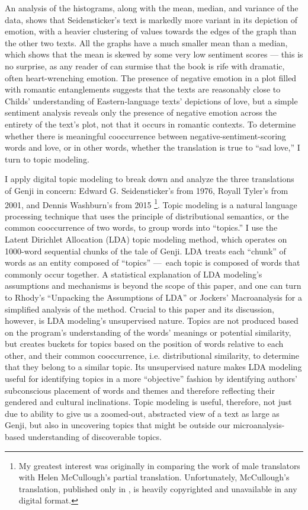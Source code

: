 \documentclass[12pt]{article}
\begin{document}
\begin{flushleft}
\begin{spacing}{2.0}
An analysis of the histograms, along with the mean, median, and variance of the data, shows that Seidensticker's text is markedly more variant in its depiction of emotion, with a heavier clustering of values towards the edges of the graph than the other two texts. All the graphs have a much smaller mean than a median, which shows that the mean is skewed by some very low sentiment scores --- this is no surprise, as any reader of  can surmise that the book is rife with dramatic, often heart-wrenching emotion. The presence of negative emotion in a plot filled with romantic entanglements suggests that the texts are reasonably close to Childs' understanding of Eastern-language texts' depictions of love, but a simple sentiment analysis reveals only the presence of negative emotion across the entirety of the text's plot, not that it occurs in romantic contexts. To determine whether there is meaningful cooccurrence between negative-sentiment-scoring words and love, or in other words, whether the translation is true to ``sad love,'' I turn to topic modeling. 

I apply digital topic modeling to break down and analyze the three translations of Genji in concern: Edward G. Seidensticker's from 1976, Royall Tyler's from 2001, and Dennis Washburn's from 2015 \footnote{ My greatest interest was originally in comparing the work of male translators with Helen McCullough's partial translation. Unfortunately, McCullough's translation, published only in , is heavily copyrighted and unavailable in any digital format.}. Topic modeling is a natural language processing technique that uses the principle of distributional semantics, or the common cooccurrence of two words, to group words into ``topics.'' I use the Latent Dirichlet Allocation (LDA) topic modeling method, which operates on 1000-word sequential chunks of the tale of Genji. LDA treats each ``chunk'' of words as an entity composed of ``topics'' --- each topic is composed of words that commonly occur together. A statistical explanation of LDA modeling's assumptions and mechanisms is beyond the scope of this paper, and one can turn to Rhody's ``Unpacking the Assumptions of LDA'' or Jockers' Macroanalysis for a simplified analysis of the method. Crucial to this paper and its discussion, however, is LDA modeling's unsupervised nature. Topics are not produced based on the program's understanding of the words' meanings or potential similarity, but creates buckets for topics based on the position of words relative to each other, and their common cooccurrence, i.e. distributional similarity, to determine that they belong to a similar topic. Its unsupervised nature makes LDA modeling useful for identifying topics in a more ``objective'' fashion by identifying authors' subconscious placement of words and themes and therefore reflecting their gendered and cultural inclinations. Topic modeling is useful, therefore, not just due to ability to give us a zoomed-out, abstracted view of a text as large as Genji, but also in uncovering topics that might be outside our microanalysis-based understanding of discoverable topics.


\end{spacing}
\end{flushleft}
\end{document}

